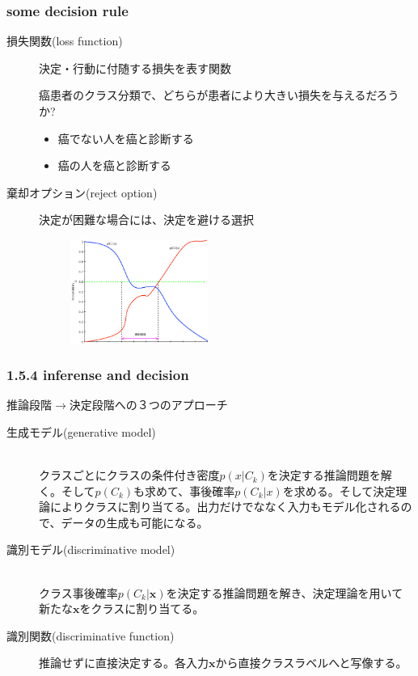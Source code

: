 \documentclass[dvipdfmx]{beamer}
\theoremstyle{definition}
\begin{document}
\begin{frame}
  \frametitle{some decision rule}
  \begin{description}
    \item[損失関数(loss function)]
      決定・行動に付随する損失を表す関数

      癌患者のクラス分類で、どちらが患者により大きい損失を与えるだろうか?
      \begin{itemize}
        \item 癌でない人を癌と診断する
        \item 癌の人を癌と診断する
      \end{itemize}
    \item[棄却オプション(reject option)]
      決定が困難な場合には、決定を避ける選択
  \begin{figure}[htb]
    \centering
    \includegraphics[width=4.5cm,clip]{res/reject_option.eps}
  \end{figure}
  \end{description}
\end{frame}

\begin{frame}
  \frametitle{1.5.4 inferense and decision}
  推論段階$\to$決定段階への３つのアプローチ
  \begin{description}
    \item[生成モデル(generative model)] \hfill \\
       クラスごとにクラスの条件付き密度$p(x|C_k)$を決定する推論問題を解く。そして$p(C_k)$も求めて、事後確率$p(C_k|x)$を求める。そして決定理論によりクラスに割り当てる。出力だけでななく入力もモデル化されるので、データの生成も可能になる。
    \item[識別モデル(discriminative model)] \hfill \\
      クラス事後確率$p(C_k|\bm{x})$を決定する推論問題を解き、決定理論を用いて新たな$\bm{x}$をクラスに割り当てる。
    \item[識別関数(discriminative function)]
      推論せずに直接決定する。各入力$\bm{x}$から直接クラスラベルへと写像する。
  \end{description}
\end{frame}
\end{document}
